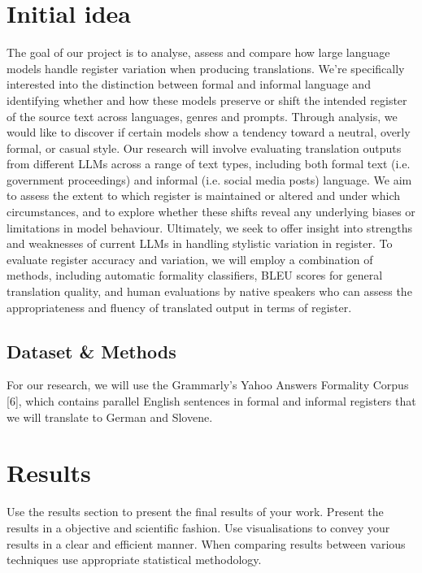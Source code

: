\documentclass[fleqn,moreauthors,10pt]{ds_report}
\begin{document}
	
	
	
	\section*{Initial idea}
	The goal of our project is to analyse, assess and compare how large language models handle register variation when producing translations. We’re specifically interested into the distinction between formal and informal language and identifying whether and how these models preserve or shift the intended register of the source text across languages, genres and prompts. Through analysis, we would like to discover if certain models show a tendency toward a neutral, overly formal, or casual style.
	Our research will involve evaluating translation outputs from different LLMs across a range of text types, including both formal text (i.e. government proceedings) and informal (i.e. social media posts) language. We aim to assess the extent to which register is maintained or altered and under which circumstances, and to explore whether these shifts reveal any underlying biases or limitations in model behaviour. Ultimately, we seek to offer insight into strengths and weaknesses of current LLMs in handling stylistic variation in register.
	To evaluate register accuracy and variation, we will employ a combination of methods, including automatic formality classifiers, BLEU scores for general translation quality, and human evaluations by native speakers who can assess the appropriateness and fluency of translated output in terms of register.
	
	
	\subsection*{Dataset \& Methods}
	
	For our research, we will use the Grammarly's Yahoo Answers Formality Corpus [6], which contains parallel English sentences in formal and informal registers that we will translate to German and Slovene. 
	
	
	
	\section*{Results}
	
	Use the results section to present the final results of your work. Present the results in a objective and scientific fashion. Use visualisations to convey your results in a clear and efficient manner. When comparing results between various techniques use appropriate statistical methodology.
	
\end{document}
